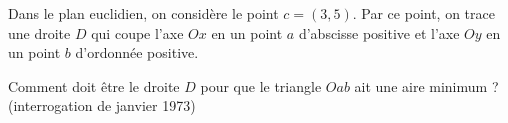 \begin{exercice}\label{exo0015}

Dans le plan euclidien, on considère le point $c=(3,5)$. Par ce point, on trace une droite $D$ qui coupe l'axe $Ox$ en un point $a$ d'abscisse positive et l'axe $Oy$ en un point $b$ d'ordonnée positive.

Comment doit être le droite $D$ pour que le triangle $Oab$ ait une aire minimum ? (interrogation de janvier 1973)

\end{exercice}
